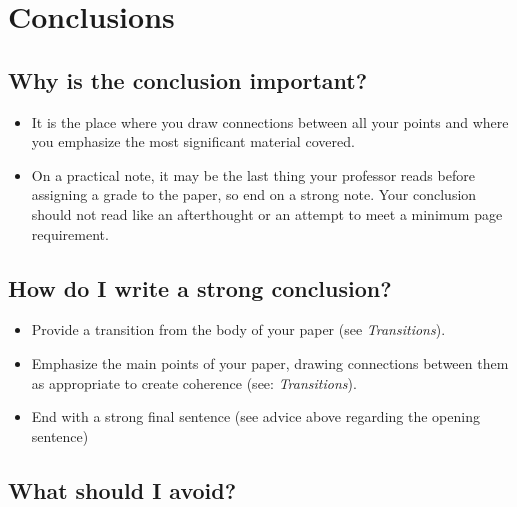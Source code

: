 


\chapter{Conclusions} 
\section{Why is the conclusion important?}

\begin{itemize}
\item It is the place where you draw connections between all your points and where you emphasize the most significant material covered.
 
\item On a practical note, it may be the last thing your professor reads before assigning a grade to the paper, so end on a strong note. Your conclusion should not read like an afterthought or an attempt to meet a minimum page requirement. 
\end{itemize}

\section{How do I write a strong conclusion?}
        	
\begin{itemize}

\item Provide a transition from the body of your paper (see \emph{Transitions}).
 
\item Emphasize the main points of your paper, drawing connections between them as appropriate to create coherence (see: \emph{Transitions}).
 
\item End with a strong final sentence (see advice above regarding the opening sentence)

\end{itemize}

\section{What should I avoid?}

